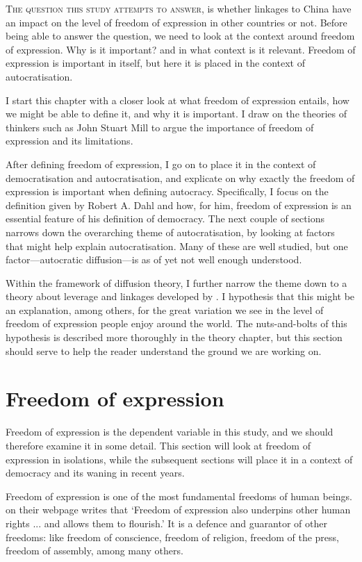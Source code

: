 \lettrine{T}{he question this study attempts to answer}, is whether linkages to China have an impact on the level of freedom of expression in other countries or not.  Before being able to answer the question, we need to look at the context around freedom of expression. Why is it important? and in what context is it relevant. Freedom of expression is important in itself, but here it is placed in the context of autocratisation.

I start this chapter with a closer look at what freedom of expression entails, how we might be able to define it, and why it is important.  I draw on the theories of thinkers such as John Stuart Mill to argue the importance of freedom of expression and its limitations.

After defining freedom of expression, I go on to place it in the context of democratisation and autocratisation, and explicate on why exactly the freedom of expression is important when defining autocracy. Specifically, I focus on the definition given by Robert A. Dahl and how, for him, freedom of expression is an essential feature of his definition of democracy. The next couple of sections narrows down the overarching theme of autocratisation, by looking at factors that might help explain autocratisation. Many of these are well studied, but one factor---autocratic diffusion---is as of yet not well enough understood. 

Within the framework of diffusion theory, I further narrow the theme down to a theory about leverage and linkages developed by \citet{levitsky_linkage_2006}. I hypothesis that this might be an explanation, among others, for the great variation we see in the level of freedom of expression people enjoy around the world. The nuts-and-bolts of this hypothesis is described more thoroughly in the theory chapter, but this section should serve to help the reader understand the ground we are working on. 

\section{Freedom of expression}
Freedom of expression is the dependent variable in this study, and we should therefore examine it in some detail. This section will look at freedom of expression in isolations, while the subsequent sections will place it in a context of democracy and its waning in recent years. 

Freedom of expression is one of the most fundamental freedoms of human beings. \citet{amnesty_international_freedom_2023} on their webpage writes that `Freedom of expression also underpins other human rights ... and allows them to flourish.'  It is a defence and guarantor of other freedoms: like freedom of conscience, freedom of religion, freedom of the press, freedom of assembly, among many others. 

